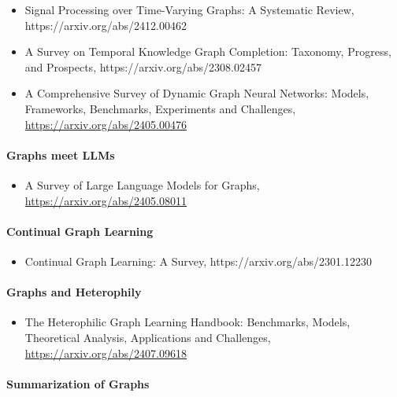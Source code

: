 \begin{itemize}
\item Signal Processing over Time-Varying Graphs: A Systematic Review, https://arxiv.org/abs/2412.00462

\item A Survey on Temporal Knowledge Graph Completion: Taxonomy, Progress, and Prospects, https://arxiv.org/abs/2308.02457

\item A Comprehensive Survey of Dynamic Graph Neural Networks: Models, Frameworks, Benchmarks, Experiments and Challenges,
\url{https://arxiv.org/abs/2405.00476}
\end{itemize}
 

\paragraph{Graphs meet LLMs}

\begin{itemize}
\item A Survey of Large Language Models for Graphs, \url{https://arxiv.org/abs/2405.08011}
\end{itemize}


\paragraph{Continual Graph Learning}

\begin{itemize}
\item Continual Graph Learning: A Survey, https://arxiv.org/abs/2301.12230
\end{itemize}
  

\paragraph{Graphs and Heterophily}

\begin{itemize}
\item The Heterophilic Graph Learning Handbook: Benchmarks, Models, Theoretical Analysis, Applications and Challenges, \url{https://arxiv.org/abs/2407.09618}
\end{itemize}


\paragraph{Summarization of Graphs}

